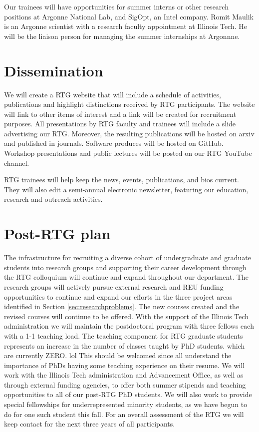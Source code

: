 \documentclass[11pt]{NSFamsart}
\begin{document}
Our trainees will have opportunities for summer interns or other research positions at Argonne National Lab, and SigOpt, an Intel company. Romit Maulik is an Argonne scientist with a research faculty appointment at Illinois Tech.  He will be the liaison person for managing the summer internships at Argonnne. 

 \section{Dissemination} 
 We will create a   RTG website that will include a schedule of activities, publications and highlight
distinctions received by RTG participants. The website will link to other items of interest and a link will
be created for recruitment purposes. All presentations by RTG faculty and trainees  will    include a slide advertising our RTG.
Moreover, the resulting publications   will be hosted on arxiv and published in journals.  Software produces will be hosted on GitHub.  Workshop  presentations and  public lectures will be posted on our RTG YouTube channel.

 

RTG trainees will help keep the news, events, publications, and bios current.  They will also edit a semi-annual electronic newsletter, 
featuring our education, research  and outreach  activities. 

 
 \section{Post-RTG plan}
The infrastructure for recruiting a diverse cohort of undergraduate and graduate students into research groups and supporting their career development through the RTG colloquium will continue and expand throughout our department.  The research groups will actively pursue external research and REU funding opportunities to continue and expand our efforts in the three project areas identified in Section \ref{sec:researchproblems}. The new courses created and the revised courses will continue to be offered.
With the support of the Illinois Tech administration we will maintain the postdoctoral program with three
fellows each with a 1-1 teaching load. The teaching component for RTG graduate students represents
an increase in the number of classes taught by PhD students. {\color{magenta}which are currently ZERO. lol} This should be welcomed since all  understand the importance of PhDs having some teaching experience on their resume.
We will work with the Illinois Tech administration and Advancement Office, as well as through external funding agencies,  to offer both summer stipends and teaching opportunities to all of our post-RTG PhD students.  We will also work to provide special fellowships for underrepresented minority students, as we have begun to do for one such student this fall.
For an overall assessment of the RTG we will keep contact for the next three years of all participants.
\end{document}
